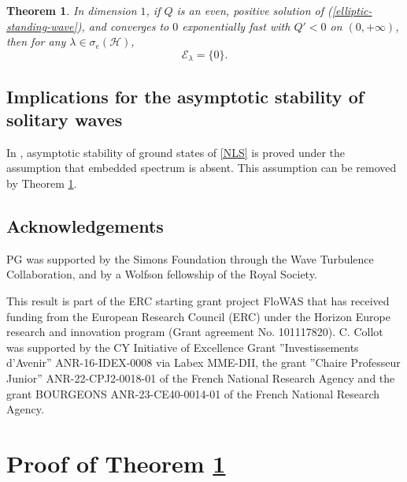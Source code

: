 \documentclass[11 pt]{amsart}
\newtheorem{thm}{Theorem}[section]
\theoremstyle{definition}
\theoremstyle{remark}
\numberwithin{equation}{section}
\begin{document}
\begin{thm}
  \label{main}
In dimension $1$, if $Q$ is an even, positive solution of (\ref{elliptic-standing-wave}), and
  converges to $0$ exponentially fast with $Q' < 0$ on $(0,+\infty)$, then for any $\lambda \in  \sigma_e (\mathcal{H})$,
  \[ \mathcal{E}_{\lambda} = \{ 0 \} .
  \]
\end{thm}

\subsection{Implications for the asymptotic stability of solitary waves}

In \cite{BuslaevPerelman,BuslaevSulem,CollotGermain,Cuccagna}, asymptotic stability of ground states of \eqref{NLS} is proved under the assumption that embedded spectrum is absent. This assumption can be removed by Theorem \ref{main}.

\subsection*{Acknowledgements} PG was supported by the Simons Foundation through the Wave Turbulence Collaboration, and by a Wolfson fellowship of the Royal Society.

This result is part of the ERC starting grant project FloWAS that has received funding from the European Research Council (ERC) under the Horizon Europe research and innovation program (Grant agreement No. 101117820). C. Collot was supported by the CY Initiative of Excellence Grant ”Investissements d’Avenir” ANR-16-IDEX-0008 via Labex MME-DII, the grant ”Chaire Professeur Junior” ANR-22-CPJ2-0018-01 of the French National Research Agency and the grant BOURGEONS ANR-23-CE40-0014-01 of the French National Research Agency.


\section{Proof of Theorem \ref{main}}
\end{document}
